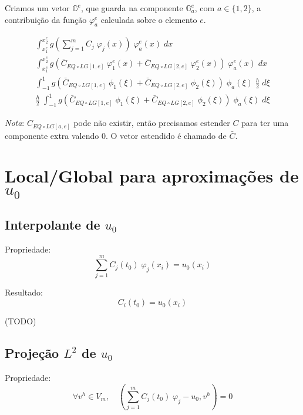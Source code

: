 \documentclass[a4paper]{article}
\newcommand{\vphi}{\varphi}
\begin{document}
Criamos um vetor \(\mathbb{G}^e\),
que guarda na componente \(\mathbb{G}^e_a\),
com \(a \in \{ 1, 2 \}\),
a contribuição da função \(\vphi^e_a\)
calculada sobre o elemento \(e\).

\[ \begin{array}{l} \displaystyle
    \int_{x^e_1}^{x^e_2}{
        g\left(\sum_{j=1}^m{ C_j \; \vphi_j(x) }\right) \; \vphi^e_a(x)
    \;dx}
    \\[2ex] \displaystyle
    \int_{x^e_1}^{x^e_2}{
        g\left(
            \bar{C}_{EQ{\circ}LG[1, e]} \; \vphi^e_1(x)
            + \bar{C}_{EQ{\circ}LG[2, e]} \; \vphi^e_2(x)
        \right) \; \vphi^e_a(x)
    \;dx}
    \\[2ex] \displaystyle
    \int_{-1}^1{
        g(
            \bar{C}_{EQ{\circ}LG[1, e]} \; \phi_1(\xi)
            + \bar{C}_{EQ{\circ}LG[2, e]} \; \phi_2(\xi)
        ) \; \phi_a(\xi)
        \; \frac{h}{2}
    \;d\xi}
    \\[2ex] \displaystyle
    \frac{h}{2} \; \int_{-1}^1{
        g(
            \bar{C}_{EQ{\circ}LG[1, e]} \; \phi_1(\xi)
            + \bar{C}_{EQ{\circ}LG[2, e]} \; \phi_2(\xi)
        ) \; \phi_a(\xi)
    \;d\xi}
\end{array} \]

\emph{Nota}: \(C_{EQ{\circ}LG[a, e]}\) pode não existir,
então precisamos estender \(C\)
para ter uma componente extra valendo \(0\).
O vetor estendido é chamado de \(\bar{C}\).

\section{Local/Global para aproximações de \texorpdfstring{\(u_0\)}{u0}}
\label{sec:U0}

\subsection{Interpolante de \texorpdfstring{\(u_0\)}{u0}}

Propriedade:
\[
    \sum_{j=1}^m{ C_j(t_0) \; \vphi_j(x_i) } = u_0(x_i)
\]

Resultado:
\[
    C_i(t_0) = u_0(x_i)
\]

(TODO)

\subsection{Projeção \texorpdfstring{\(L^2\)}{L2} de \texorpdfstring{\(u_0\)}{u0}}

Propriedade:
\[
    \forall v^h \in V_m, \quad
    (\sum_{j=1}^m{ C_j(t_0) \; \vphi_j } - u_0, v^h) = 0
\]
\end{document}

